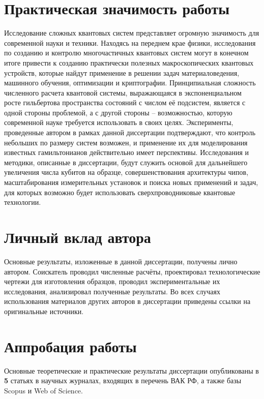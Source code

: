 \documentclass[14pt, a4paper]{extreport}
\numberwithin{equation}{section}
\begin{document}
\section*{Практическая значимость работы}

Исследование сложных квантовых систем представляет огромную значимость для современной науки и техники. Находясь на переднем крае физики, исследования по созданию и контролю многочастичных квантовых систем могут в конечном итоге привести к созданию практически полезных макроскопических квантовых устройств, которые найдут применение в решении задач материаловедения, машинного обучения, оптимизации и криптографии. Принципиальная сложность численного расчета квантовой системы, выражающаяся в экспоненциальном росте гильбертова пространства состояний с числом её подсистем, является с одной стороны проблемой, а с другой стороны -- возможностью, которую современной науке требуется использовать в своих целях. Эксперименты, проведенные автором в рамках данной диссертации подтверждают, что контроль небольших по размеру систем возможен, и применение их для моделирования известных гамильтонианов действительно имеет перспективы. Исследования и методики, описанные в диссертации, будут служить основой для дальнейшего увеличения числа кубитов на образце, совершенствования архитектуры чипов, масштабирования измерительных установок и поиска новых применений и задач, для которых возможно будет использовать сверхпроводниковые квантовые технологии.

\section*{Личный вклад автора}

Основные результаты, изложенные в данной диссертации, получены лично автором. Соискатель проводил численные расчёты, проектировал технологические чертежи для изготовления образцов, проводил экспериментальные их исследования, анализировал полученные результаты. Во всех случаях использования материалов других авторов в диссертации приведены ссылки
на оригинальные источники.

\section*{Аппробация работы}

Основные теоретические и практические результаты диссертации
опубликованы в \textbf{5} статьях в научных журналах, входящих в перечень ВАК
РФ, а также базы Scopus и Web of Science.
\end{document}
